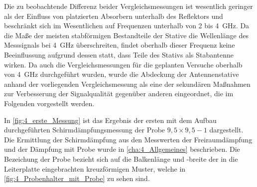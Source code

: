 Die zu beobachtende Differenz beider Vergleichsmessungen ist wesentlich geringer als der Einfluss von platzierten Absorbern unterhalb des Reflektors und beschränkt sich im Wesentlichen auf Frequenzen unterhalb von 2 bis \SI{4}{\giga\hertz}. Da die Maße der meisten stabförmigen Bestandteile der Stative die Wellenlänge des Messsignals bei \SI{4}{\giga\hertz} überschreiten, findet oberhalb dieser Frequenz keine Beeinflussung aufgrund dessen statt, dass Teile des Stativs als Stabantenne wirken. Da auch die Vergleichsmessungen für die geplanten Versuche oberhalb von \SI{4}{\giga\hertz} durchgeführt wurden, wurde die Abdeckung der Antennenstative anhand der vorliegenden Vergleichsmessung als eine der sekundären Maßnahmen zur Verbesserung der Signalqualität gegenüber anderen eingeordnet, die im Folgenden vorgestellt werden.
\par
\vspace{\linespace}
In \Abb\ref{fig:4_erste_Messung} ist das Ergebnis der ersten mit dem Aufbau durchgeführten Schirmdämpfungsmessung der Probe $9,5\times9,5-1$ dargestellt. Die Ermittlung der Schirmdämpfung aus den Messwerten der Freiraumdämpfung und der Dämpfung mit Probe wurde in \Abschnitt\ref{cha:4_Allgemeines} beschrieben. Die Bezeichung der Probe bezieht sich auf die Balkenlänge und -breite der in die Leiterplatte eingebrachten kreuzförmigen Muster, welche in \Abb\ref{fig:4_Probenhalter_mit_Probe} zu sehen sind.
\par
\vspace{\linespace}


